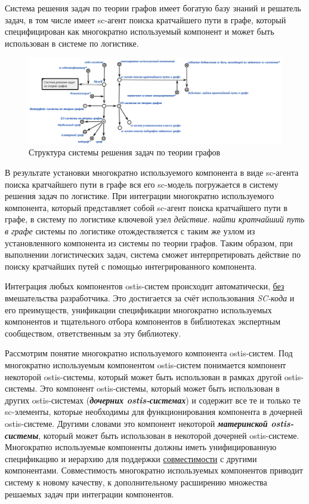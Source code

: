 Система решения задач по теории графов имеет богатую базу знаний и решатель задач, в том числе имеет sc-агент поиска кратчайшего пути в графе, который специфицирован как многократно используемый компонент и может быть использован в системе по логистике.

\begin{figure}[H]
	\includegraphics[scale=0.4]{author/part5/figures/graph_theory_system.png}
	\caption{Структура системы решения задач по теории графов}
	\label{fig:graph_theory_system}
\end{figure}

В результате установки многократно используемого компонента в виде sc-агента поиска кратчайшего пути в графе вся его sc-модель погружается в систему решения задач по логистике. При интеграции многократно используемого компонента, который представляет собой sc-агент поиска кратчайшего пути в графе, в систему по логистике ключевой узел \textit{действие. найти кратчайший путь в графе} системы по логистике отождествляется с таким же узлом из установленного компонента из системы по теории графов. Таким образом, при выполнении логистических задач, система сможет интерпретировать действие по поиску кратчайших путей с помощью интегрированного компонента.

Интеграция любых компонентов ostis-систем происходит автоматически, \underline{без} вмешательства разработчика. Это достигается за счёт использования \textit{SC-кода} и его преимуществ, унификации спецификации многократно используемых компонентов и тщательного отбора компонентов в библиотеках экспертным сообществом, ответственным за эту библиотеку.

Рассмотрим понятие многократно используемого компонента ostis-систем. Под многократно используемым компонентом ostis-систем понимается  компонент некоторой ostis-системы, который может быть использован в рамках другой ostis-системы. Это компонент ostis-системы, который может быть использован в других ostis-системах (\textbf{\textit{дочерних ostis-системах}}) и содержит все те и только те sc-элементы, которые необходимы для функционирования компонента в дочерней ostis-системе. Другими словами это компонент некоторой \textbf{\textit{материнской ostis-системы}}, который может быть использован в некоторой дочерней ostis-системе. Многократно используемые компоненты должны иметь унифицированную спецификацию и иерархию для поддержки \underline{совместимости} с другими компонентами. Совместимость многократно используемых компонентов приводит систему к новому качеству, к дополнительному расширению множества решаемых задач при интеграции компонентов.

